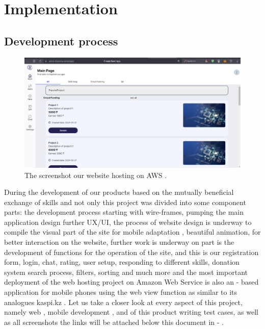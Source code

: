 \chapter{Implementation}\label{ch:D}
\section{Development process}\label{devprc}
\begin{figure}[ht]\label{fig:market}
  \centering
  \includegraphics[width=0.8\linewidth]{figures/Website.png}
  \caption{The screenshot our website hosting on AWS \cite{aws}.}
\end{figure}

During the development of our products based on the mutually beneficial exchange of skills and not only this project was divided into some component parts: the  development process starting with wire-frames, pumping the main application design further UX/UI, the process of website design is underway to compile the visual part of the site for mobile adaptation , beautiful animation, for better interaction on the website, further work is underway on  part is the development of functions for the operation of the site, and this is our registration form, login, chat, rating, user setup, responding to different skills, donation system search process, filters, sorting and much more and the most important deployment of the web hosting project on Amazon Web Service \cite{aws}  is also an  - based application for mobile phones using the web view function as similar to its analogues kaspi.kz \cite{kaspi}. Let us take a closer look at every aspect of this project, namely web , mobile development , and  of this product writing test cases, as well as all screenshots the links will be attached below this document in -  .

\newpage
